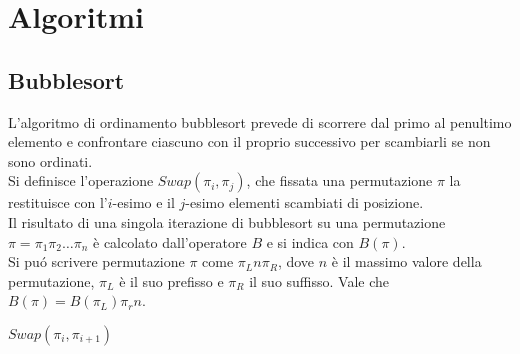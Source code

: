 \section*{Algoritmi}
\subsection*{Bubblesort}
L'algoritmo di ordinamento bubblesort prevede di scorrere dal primo al penultimo elemento e confrontare ciascuno con il proprio successivo per scambiarli se non sono ordinati.\\
Si definisce l'operazione $Swap(\pi_i,\pi_j)$, che fissata una permutazione $\pi$ la restituisce con l'$i$-esimo e il $j$-esimo elementi scambiati di posizione. \\
Il risultato di una singola iterazione di bubblesort su una permutazione $\pi=\pi_1\pi_2\dots\pi_n$ \`e calcolato dall'operatore $B$ e si indica con $B(\pi)$.\\
Si pu\'o scrivere permutazione $\pi$ come $\pi_Ln\pi_R$, dove $n$ \`e il massimo valore della permutazione, $\pi_L$ \`e il suo prefisso e $\pi_R$ il suo suffisso. Vale che $B(\pi) = B(\pi_L)\pi_rn$.\\
\begin{algorithm}[H]
   \caption{$B - bubblesort$}
\begin{algorithmic}[1]
   \State $Swap(\pi_i,\pi_{i+1})$
   \EndIf
   \EndFor
\end{algorithmic}
\end{algorithm}
